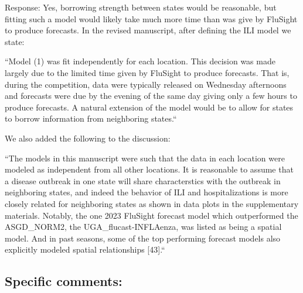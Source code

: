 \documentclass{article}
\newcommand{\spencer}[1]{{\color{red} Response: #1}}
\begin{document}
\begin{enumerate}[1.]
\spencer{Yes, borrowing strength between states would be reasonable, but 
fitting such a model would likely take much more time than was give by FluSight
to produce forecasts. In the revised manuscript, after defining the ILI model
we state:

``Model (1) was fit 
independently for each location. This decision was made largely due to the 
limited time given by FluSight to produce forecasts. That is,
during the competition, data were typically released on Wednesday afternoons and
forecasts were due by the evening of the same day giving only a few hours to 
produce forecasts. A natural extension of the model would be to allow for states
to borrow information from neighboring states.`` 

We also added the following to the discussion:

``The models in this manuscript were such that the data in each
location were modeled as
independent from all other locations. It is reasonable to assume that a
disease outbreak in one state will share characterstics with the outbreak in 
neighboring states, and indeed the behavior of ILI and hospitalizations is more
closely related for neighboring states as shown in data plots in the
supplementary materials. Notably, the one 2023 FluSight forecast model which 
outperformed
the ASGD\_NORM2, the UGA\_flucast-INFLAenza, was listed as being a spatial
model. And in past seasons, some of the top performing forecast models also 
explicitly modeled spatial relationships [43].``}

\end{enumerate}


\subsection*{Specific comments:}
\end{document}
